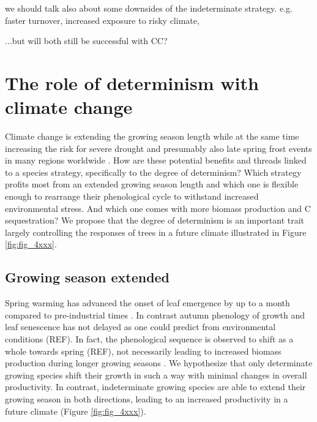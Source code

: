 \documentclass{article}
\begin{document}
	we should talk also about some downsides of the indeterminate strategy. e.g. faster turnover, increased exposure to risky climate, 
	
	...but will both still be successful with CC?
	
\section*{The role of determinism with climate change}
Climate change is extending the growing season length while at the same time increasing the risk for severe drought \citep{haoChangesSeverityCompound2018} and presumably also late spring frost events in many regions worldwide \citep{zohnerLatespringFrostRisk2020}. How are these potential benefits and threads linked to a species strategy, specifically to the degree of determinism? Which strategy profits most from an extended growing season length and which one is flexible enough to rearrange their phenological cycle to withstand increased environmental stress. And which one comes with more biomass production and C sequestration? We propose that the degree of determinism is an important trait largely controlling the responses of trees in a future climate illustrated in Figure \ref{fig:fig_4xxx}. 

			\subsection*{Growing season extended}
Spring warming has advanced the onset of leaf emergence by up to a month compared to pre-industrial times \citep{vitasseGreatAccelerationPlant2022b}. In contrast autumn phenology of growth and leaf senescence has not delayed as one could predict from environmental conditions (REF). In fact, the phenological sequence is observed to shift as a whole towards spring (REF), not necessarily leading to increased biomass production during longer growing seasons \citep{zaniIncreasedGrowingseasonProductivity2020b}. We hypothesize that only determinate growing species shift their growth in such a way with minimal changes in overall productivity. In contrast, indeterminate growing species are able to extend their growing season in both directions, leading to an increased productivity in a future climate (Figure \ref{fig:fig_4xxx}). 
\end{document}
